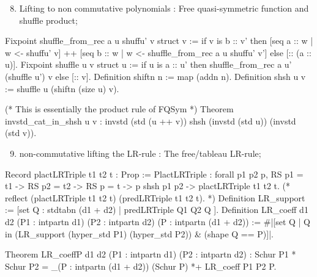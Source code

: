 \documentclass[compress,11pt]{beamer}
\begin{document}
\begin{frame}[fragile]
  \begin{enumerate}
    \setcounter{enumi}{7}
  \item Lifting to non commutative polynomials : Free quasi-symmetric function
    and shuffle product;
  \end{enumerate}

  \begin{coqcode}
Fixpoint shuffle_from_rec a u shuffu' v {struct v} :=
  if v is b :: v' then
    [seq a :: w | w <- shuffu' v] ++ 
    [seq b :: w | w <- shuffle_from_rec a u shuffu' v']
  else [:: (a :: u)].
Fixpoint shuffle u v {struct u} :=
  if u is a :: u' then
    shuffle_from_rec a u' (shuffle u') v
  else [:: v].
Definition shiftn    n := map (addn n).
Definition shsh u v := shuffle u (shiftn (size u) v).

(* This is essentially the product rule of FQSym *)
Theorem invstd_cat_in_shsh u v :
  invstd (std (u ++ v)) \in shsh (invstd (std u)) (invstd (std v)).
  \end{coqcode}
\end{frame}

\begin{frame}[fragile]
  \begin{enumerate}
    \setcounter{enumi}{8}
  \item non-commutative lifting the LR-rule : The free/tableau LR-rule;
  \end{enumerate}

  \begin{coqcode}
Record plactLRTriple t1 t2 t : Prop :=
  PlactLRTriple :
    forall p1 p2 p, RS p1 = t1 -> RS p2 = t2 -> RS p = t ->
                    p \in shsh p1 p2 -> plactLRTriple t1 t2 t.
(* reflect (plactLRTriple t1 t2 t) (predLRTriple t1 t2 t). *)
Definition LR_support :=
  [set Q : stdtabn (d1 + d2) | predLRTriple Q1 Q2 Q ].
Definition LR_coeff d1 d2 
  (P1 : intpartn d1) (P2 : intpartn d2) (P : intpartn (d1 + d2)) :=
  #|[set Q | Q in (LR_support (hyper_std P1) (hyper_std P2)) & 
                  (shape Q == P)]|.

Theorem LR_coeffP d1 d2 (P1 : intpartn d1) (P2 : intpartn d2) :
  Schur P1 * Schur P2 = 
    \sum_(P : intpartn (d1 + d2)) (Schur P) *+ LR_coeff P1 P2 P.
  \end{coqcode}
\end{frame}
\end{document}
